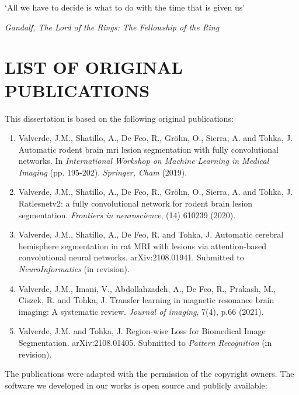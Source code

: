 \indent\hspace{6mm}\textit{\theauthor}
\vfill

\newpage
\par

\phantom{.}

\vspace{5cm}
\noindent
\lq All we have to decide is what to do with the time that is given us\rq


\vspace{1cm} \noindent 
\textit{Gandalf, The Lord of the Rings: The Fellowship of the Ring}
\vfill

%
\cleardoublepage
%
%
\section*{{\fontsize{16pt}{0}\selectfont \normalfont LIST OF ORIGINAL PUBLICATIONS}}

%
\vspace{0.1in}
This dissertation is based on the following original publications:
%
\begin{enumerate}
%
\item[\textbf{\myp{1}}]
Valverde, J.M., Shatillo, A., De Feo, R., Gröhn, O., Sierra, A. and Tohka, J. Automatic rodent brain mri lesion segmentation with fully convolutional networks. In \textit{International Workshop on Machine Learning in Medical Imaging} (pp. 195-202). \textit{Springer, Cham} (2019).

\item[\textbf{\myp{2}}]
Valverde, J.M., Shatillo, A., De Feo, R., Gröhn, O., Sierra, A. and Tohka, J. Ratlesnetv2: a fully convolutional network for rodent brain lesion segmentation. \textit{Frontiers in neuroscience}, (14) 610239 (2020).

\item[\textbf{\myp{3}}]
Valverde, J.M., Shatillo, A., De Feo, R. and Tohka, J. Automatic cerebral hemisphere segmentation in rat MRI with lesions via attention-based convolutional neural networks. arXiv:2108.01941. Submitted to \textit{NeuroInformatics} (in revision).

\item[\textbf{\myp{4}}]
Valverde, J.M., Imani, V., Abdollahzadeh, A., De Feo, R., Prakash, M., Ciszek, R. and Tohka, J. Transfer learning in magnetic resonance brain imaging: A systematic review. \textit{Journal of imaging}, 7(4), p.66 (2021).

\item[\textbf{\myp{5}}]
Valverde, J.M. and Tohka, J. Region-wise Loss for Biomedical Image Segmentation. arXiv:2108.01405. Submitted to \textit{Pattern Recognition} (in revision).
%
\end{enumerate}
%
\vspace{2mm}
\noindent
The publications were adapted with the permission of the copyright owners.
The software we developed in our works is open source and publicly available:

